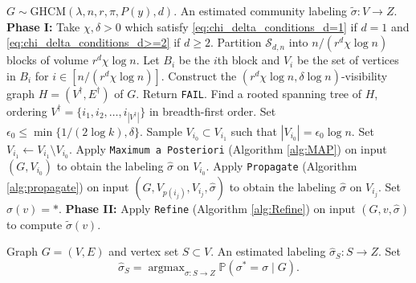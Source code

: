 \documentclass{article}
\DeclareMathOperator*{\argmax}{argmax}
\renewcommand{\P}{\mathbb{P}}
\newcommand{\1}{\mathbbm{1}}
\newcommand{\calS}{\mathcal{S}}
\theoremstyle{definition}
\theoremstyle{plain}
\begin{document}
\begin{algorithm}
\caption{Exact Recovery for $d \geq 2$ and $d = 1$, $\lambda r > 1$}
\label{alg:exact_recovery}
\begin{algorithmic}[1]
\Require $G \sim \text{GHCM}(\lambda, n, r, \pi, P(y), d)$.
\Ensure An estimated community labeling $\tilde{\sigma}: V \to Z$.
\State \textbf{Phase I:}
\State Take $\chi, \delta > 0$ which satisfy \eqref{eq:chi_delta_conditions_d=1} if $d = 1$ and \eqref{eq:chi_delta_conditions_d>=2} if $d \geq 2$. \label{line:pick_chi_delta}
\State Partition $\calS_{d, n}$ into $n / (r^d \chi \log n)$ blocks of volume $r^d \chi \log n$. Let $B_i$ be the $i$th block and $V_i$ be the set of vertices in $B_i$ for $i \in [n / (r^d \chi \log n)]$. \label{line:construct_blocks}
\State Construct the $(r^d \chi \log n, \delta \log n)$-visibility graph $H = (V^\dagger, E^\dagger)$ of $G$. \label{line:construct_visibility_graph}
    \State Return \texttt{FAIL}.
\EndIf
\State Find a rooted spanning tree of $H$, ordering $V^\dagger = \{i_1, i_2, \ldots, i_{|V^\dagger|}\}$ in breadth-first order.
\State Set $\epsilon_0 \leq \min\{1/(2 \log k), \delta\}$. Sample $V_{i_0} \subset V_{i_1}$ such that $|V_{i_0}| = \epsilon_0 \log n$. Set $V_{i_1} \gets V_{i_1} \setminus V_{i_0}$.
\State Apply \texttt{Maximum a Posteriori} (Algorithm \ref{alg:MAP}) on input $(G, V_{i_0})$ to obtain the labeling $\hat{\sigma}$ on $V_{i_0}$.
    \State Apply \texttt{Propagate} (Algorithm \ref{alg:propagate}) on input $(G, V_{p(i_j)}, V_{i_j}, \hat{\sigma})$ to obtain the labeling $\hat{\sigma}$ on $V_{i_j}$.
\EndFor
{}
    \State Set $\hat{\sigma}(v) = *$.
\EndFor
\State \textbf{Phase II:}
    \State Apply \texttt{Refine} (Algorithm \ref{alg:Refine}) on input $(G, v, \hat{\sigma})$ to compute $\tilde{\sigma}(v)$.
\EndFor
\end{algorithmic}
\end{algorithm}

\begin{algorithm}
\caption{\texttt{Maximum a Posteriori (MAP)}}
\label{alg:MAP}
\begin{algorithmic}[1]
\Require Graph $G = (V, E)$ and vertex set $S \subset V$.
\Ensure An estimated labeling $\hat{\sigma}_S: S \to Z$.
\State Set 
\begin{equation*}
    \hat{\sigma}_S = \argmax_{\sigma:S \to Z} \P(\sigma^* = \sigma \mid G).
\end{equation*}
\end{algorithmic}
\end{algorithm}
\end{document}
